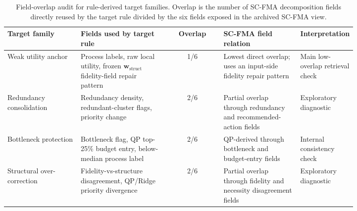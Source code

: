 \documentclass[a4paper,fleqn]{cas-sc}
\newcommand{\wstruct}{\ensuremath{\mathbf{w}_{\mathrm{struct}}}}
\begin{document}
\begin{table}[ht]
\caption{Field-overlap audit for rule-derived target families. Overlap is the number of SC-FMA decomposition fields directly reused by the target rule divided by the six fields exposed in the archived SC-FMA view.}
\label{tab:target-circularity-audit}
\centering
\scriptsize
\renewcommand{\arraystretch}{1.08}
\begin{tabular}{Z{0.21\linewidth}Z{0.25\linewidth}cZ{0.22\linewidth}Z{0.14\linewidth}}
\toprule
\textbf{Target family} & \textbf{Fields used by target rule} & \textbf{Overlap} & \textbf{SC-FMA field relation} & \textbf{Interpretation} \\
\midrule
Weak utility anchor & Process labels, raw local utility, frozen \wstruct{} fidelity-field repair pattern & 1/6 & Lowest direct overlap; uses an input-side fidelity repair pattern & Main low-overlap retrieval check \\
Redundancy consolidation & Redundancy density, redundant-cluster flags, priority change & 2/6 & Partial overlap through redundancy and recommended-action fields & Exploratory diagnostic \\
Bottleneck protection & Bottleneck flag, QP top-25\% budget entry, below-median process label & 2/6 & QP-derived through bottleneck and budget-entry fields & Internal consistency check \\
Structural over-correction & Fidelity-vs-structure disagreement, QP/Ridge priority divergence & 2/6 & Partial overlap through fidelity and necessity disagreement fields & Exploratory diagnostic \\
\bottomrule
\end{tabular}
\end{table}
\end{document}
